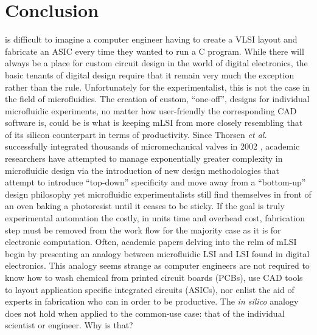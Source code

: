 \documentclass[11pt,journal,compsoc, onecolumn]{IEEEtran}
\begin{document}
\section{Conclusion}
 is difficult to imagine a computer engineer having to create a VLSI layout and
fabricate an ASIC every time they wanted to run a C program. While there will
always be a place for custom circuit design in the world of digital
electronics, the basic tenants of digital design require that it remain
very much the exception rather than the rule. Unfortunately for the
experimentalist, this is not the case in the field of microfluidics. 
The creation of custom, ``one-off'', designs
for individual microfluidic experiments, no matter how user-friendly the
corresponding CAD software is, could be is what is keeping mLSI from
more closely resembling that of its silicon counterpart in terms of
productivity. Since Thorsen \emph{et al.} successfully integrated thousands of
micromechanical valves in 2002 \cite{thorsen2002}, academic researchers have
attempted to manage exponentially greater complexity in microfluidic design via
the introduction of new design methodologies that attempt to introduce
``top-down'' specificity and move away from a ``bottom-up'' design philosophy
 \cite{minhass2013}\cite{melin2007}\cite{minhass2012} yet microfluidic
 experimentalists still find themselves in front of an oven baking a photoresist
until it ceases to be sticky. If the goal is truly experimental automation the
costly, in units time and overhead cost, fabrication step must be removed from the
work flow for the majority case as it is for electronic computation. 
Often, academic papers delving into the relm of mLSI begin by presenting an analogy
between microfluidic LSI and LSI found in digital electronics. This analogy seems
strange as computer engineers are not required to know how to wash chemical
from printed circuit boards (PCBs), use CAD tools to layout application
specific integrated circuits (ASICs), nor enlist the aid of experts in
fabrication who can in order to be productive.  The \emph{in
silico} analogy does not hold when applied to the common-use case: that of the
individual scientist or
engineer. Why is that? 
\end{document}

